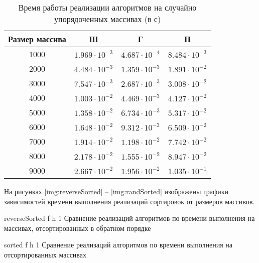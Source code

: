 \begin{table}[h]
	\begin{center}
		\begin{threeparttable}
			\captionsetup{justification=raggedright,singlelinecheck=off}
			\caption{Время работы реализации алгоритмов на случайно упорядоченных массивах (в с)}
			\label{tbl:time_measurements_rand}
			\begin{tabular}{|c|c|c|c|}
				\hline
				Размер массива &  Ш  & Г & П \\
				\hline
				1000 &$ 1.969\cdot 10^{-3} $&$ 4.687\cdot 10^{-4} $&$ 8.484\cdot 10^{-3}$\\
				\hline
				2000 &$ 4.484\cdot 10^{-3} $&$ 1.359\cdot 10^{-3} $&$ 1.891\cdot 10^{-2}$\\
				\hline
				3000 &$ 7.547\cdot 10^{-3} $&$ 2.687\cdot 10^{-3} $&$ 3.008\cdot 10^{-2}$\\
				\hline
				4000 &$ 1.003\cdot 10^{-2} $&$ 4.469\cdot 10^{-3} $&$ 4.127\cdot 10^{-2}$\\
				\hline
				5000 &$ 1.358\cdot 10^{-2} $&$ 6.734\cdot 10^{-3} $&$ 5.317\cdot 10^{-2}$\\
				\hline
				6000 &$ 1.648\cdot 10^{-2} $&$ 9.312\cdot 10^{-3} $&$ 6.509\cdot 10^{-2}$\\
				\hline
				7000 &$ 1.914\cdot 10^{-2} $&$ 1.198\cdot 10^{-2} $&$ 7.742\cdot 10^{-2}$\\
				\hline
				8000 &$ 2.178\cdot 10^{-2} $&$ 1.555\cdot 10^{-2} $&$ 8.947\cdot 10^{-2}$\\
				\hline
				9000 &$ 2.667\cdot 10^{-2} $&$ 1.956\cdot 10^{-2} $&$ 1.035\cdot 10^{-1}$\\
				\hline
			\end{tabular}
		\end{threeparttable}
	\end{center}
\end{table}

\clearpage
На рисунках \ref{img:reverseSorted} -- \ref{img:randSorted} изображены графики зависимостей времени выполнения реализаций сортировок от размеров массивов.

{reverseSorted} %
{f} %
{h} %
{1\textwidth} %
{Сравнение реализаций алгоритмов по времени выполнения на массивах, отсортированных в обратном порядке} %

{sorted} %
{f} %
{h} %
{1\textwidth} %
{Сравнение реализаций алгоритмов по времени выполнения на отсортированных массивах} %

